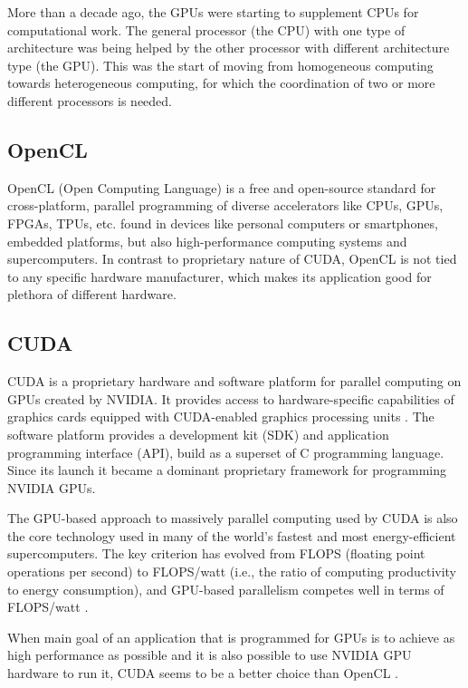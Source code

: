 More than a decade ago, the GPUs were starting to supplement CPUs for computational work. The general processor (the CPU) with one type of architecture was being helped by the other processor with different architecture type (the GPU). This was the start of moving from homogeneous computing towards heterogeneous computing, for which the coordination of two or more different processors is needed. 

\subsection{OpenCL}
OpenCL (Open Computing Language) is a free and open-source standard for cross-platform, parallel programming of diverse accelerators like CPUs, GPUs, FPGAs, TPUs, etc. found in devices like personal computers or smartphones, embedded platforms, but also high-performance computing systems and supercomputers. In contrast to proprietary nature of CUDA, OpenCL is not tied to any specific hardware manufacturer, which makes its application good for plethora of different hardware.

\subsection{CUDA}
CUDA is a proprietary hardware and software platform for parallel computing on GPUs created by NVIDIA. It provides access to hardware-specific capabilities of graphics cards equipped with CUDA-enabled graphics processing units \citep{stortiCUDAEngineersIntroduction2016}. The software platform provides a development kit (SDK) and application programming interface (API), build as a superset of C programming language. Since its launch it became a dominant proprietary framework for programming NVIDIA GPUs.

The GPU-based approach to massively parallel computing used by CUDA is also the core technology used in many of the world’s fastest and most energy-efficient supercomputers. The key criterion has evolved from FLOPS (floating point operations per second) to FLOPS/watt (i.e., the ratio of computing productivity to energy consumption), and GPU-based parallelism competes well in terms of FLOPS/watt \citep{stortiCUDAEngineersIntroduction2016}.

When main goal of an application that is programmed for GPUs is to achieve as high performance as possible and it is also possible to use NVIDIA GPU hardware to run it, CUDA seems to be a better choice than OpenCL \citep{karimiPerformanceComparisonCUDAa}.

